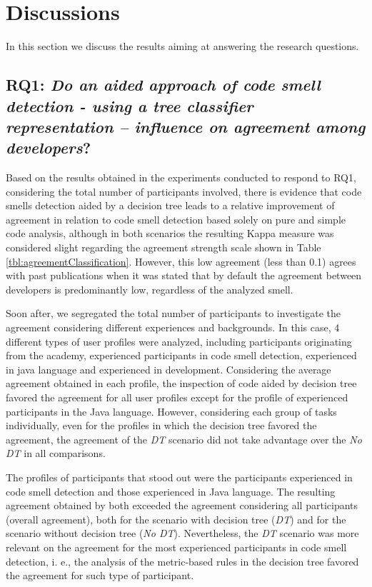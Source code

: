 \chapter{Discussions}
\label{sec:discussions}

In this section we discuss the results aiming at answering the research questions. 

\section{\textbf{RQ1}: \textit{Do an aided approach of code smell detection - using a tree classifier representation – influence on agreement among developers}?}
Based on the results obtained in the experiments conducted to respond to RQ1, considering the total number of participants involved, there is evidence that code smells detection aided by a decision tree leads to a relative improvement of agreement in relation to code smell detection based solely on pure and simple code analysis, although in both scenarios the resulting Kappa measure was considered slight regarding the agreement strength scale shown in Table \ref{tbl:agreementClassification}. However, this low agreement (less than 0.1) agrees with past publications \cite{hozano2018you} when it was stated that by default the agreement between developers is predominantly low, regardless of the analyzed smell.

Soon after, we segregated the total number of participants to investigate the agreement considering different experiences and backgrounds. In this case, 4 different types of user profiles were analyzed, including participants originating from the academy, experienced participants in code smell detection, experienced in java language and experienced in development. Considering the average agreement obtained in each profile, the inspection of code aided by decision tree favored the agreement for all user profiles except for the profile of experienced participants in the Java language. However, considering each group of tasks individually, even for the profiles in which the decision tree favored the agreement, the agreement of the \textit{DT} scenario did not take advantage over the \textit{No DT} in all comparisons.

The profiles of participants that stood out were the participants experienced in code smell detection and those experienced in Java language. The resulting agreement obtained by both exceeded the agreement considering all participants (overall agreement), both for the scenario with decision tree (\textit{DT}) and for the scenario without decision tree (\textit{No DT}). Nevertheless, the \textit{DT} scenario was more relevant on the agreement for the most experienced participants in code smell detection, i. e., the analysis of the metric-based rules in the decision tree favored the agreement for such type of participant.

